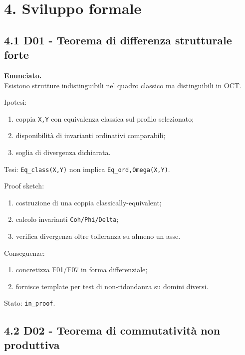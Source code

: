 \section{4. Sviluppo formale}

\subsection{4.1 D01 - Teorema di differenza strutturale forte}

\textbf{Enunciato.}\\
Esistono strutture indistinguibili nel quadro classico ma distinguibili in OCT.

Ipotesi:

\begin{enumerate}
\def\labelenumi{\arabic{enumi}.}
\tightlist
\item
  coppia \texttt{X,Y} con equivalenza classica sul profilo selezionato;
\item
  disponibilità di invarianti ordinativi comparabili;
\item
  soglia di divergenza dichiarata.
\end{enumerate}

Tesi:
\texttt{Eq\_class(X,Y)} non implica \texttt{Eq\_ord,Omega(X,Y)}.

Proof sketch:

\begin{enumerate}
\def\labelenumi{\arabic{enumi}.}
\tightlist
\item
  costruzione di una coppia classically-equivalent;
\item
  calcolo invarianti \texttt{Coh/Phi/Delta};
\item
  verifica divergenza oltre tolleranza su almeno un asse.
\end{enumerate}

Conseguenze:

\begin{enumerate}
\def\labelenumi{\arabic{enumi}.}
\tightlist
\item
  concretizza F01/F07 in forma differenziale;
\item
  fornisce template per test di non-ridondanza su domini diversi.
\end{enumerate}

Stato: \texttt{in\_proof}.

\subsection{4.2 D02 - Teorema di commutatività non produttiva}

